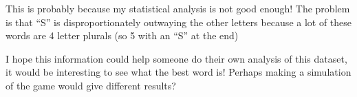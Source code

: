 \documentclass[11pt]{article}
\makeatletter
\newcommand{\boxspacing}{\kern\kvtcb@left@rule\kern\kvtcb@boxsep}
\newcommand{\prompt}[4]{
        {\ttfamily\llap{{\color{#2}[#3]:\hspace{3pt}#4}}\vspace{-\baselineskip}}
    }
\makeatother
\begin{document}
This is probably because my statistical analysis is not good enough! The
problem is that ``S'' is disproportionately outwaying the other letters
because a lot of these words are 4 letter plurals (so 5 with an ``S'' at
the end)

I hope this information could help someone do their own analysis of this
dataset, it would be interesting to see what the best word is! Perhaps
making a simulation of the game would give different results?

    \begin{tcolorbox}[breakable, size=fbox, boxrule=1pt, pad at break*=1mm,colback=cellbackground, colframe=cellborder]
\prompt{In}{incolor}{ }{\boxspacing}
\begin{Verbatim}[commandchars=\\\{\}]

\end{Verbatim}
\end{tcolorbox}


    
    
    
\end{document}
